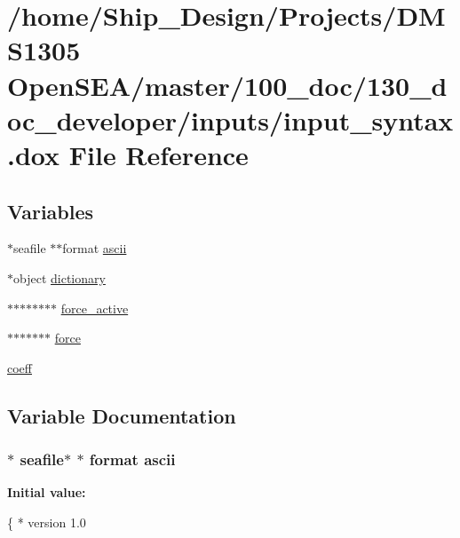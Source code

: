\hypertarget{input__syntax_8dox}{\section{/home/\-Ship\-\_\-\-Design/\-Projects/\-D\-M\-S1305 Open\-S\-E\-A/master/100\-\_\-doc/130\-\_\-doc\-\_\-developer/inputs/input\-\_\-syntax.dox File Reference}
\label{input__syntax_8dox}
}
\subsection*{Variables}
\begin{DoxyCompactItemize}
\item 
$\ast$seafile $\ast$$\ast$format \hyperlink{input__syntax_8dox_a313425a3b4f3823629d2324dff9efe63}{ascii}
\item 
$\ast$object \hyperlink{input__syntax_8dox_aae49127e1d788bc3212614cd2848e7f9}{dictionary}
\item 
$\ast$$\ast$$\ast$$\ast$$\ast$$\ast$$\ast$$\ast$ \hyperlink{input__syntax_8dox_a09f79fdfedb53de23a0046804e91075d}{force\-\_\-active}
\item 
$\ast$$\ast$$\ast$$\ast$$\ast$$\ast$$\ast$ \hyperlink{input__syntax_8dox_ab0a92c70357da47fe86696522eab7dc8}{force}
\item 
\hyperlink{input__syntax_8dox_a683c89e90662ba53f43be1061d4e39aa}{coeff}
\end{DoxyCompactItemize}


\subsection{Variable Documentation}
\hypertarget{input__syntax_8dox_a313425a3b4f3823629d2324dff9efe63}{
\subsubsection[{ascii}]{\setlength{\rightskip}{0pt plus 5cm}$\ast$ seafile$\ast$ $\ast$ format ascii}}\label{input__syntax_8dox_a313425a3b4f3823629d2324dff9efe63}
{\bfseries Initial value\-:}
\begin{DoxyCode}
\{
*     version     1.0
\end{DoxyCode}


